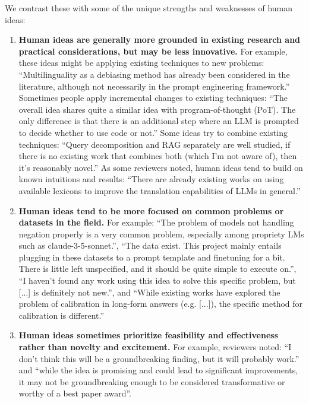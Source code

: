 We contrast these with some of the unique strengths and weaknesses of human ideas:

\begin{enumerate}
    \item \textbf{Human ideas are generally more grounded in existing research and practical considerations, but may be less innovative.} For example, these ideas might be applying existing techniques to new problems: ``Multilinguality as a debiasing method has already been considered in the literature, although not necessarily in the prompt engineering framework.'' Sometimes people apply incremental changes to existing techniques: ``The overall idea shares quite a similar idea with program-of-thought (PoT). The only difference is that there is an additional step where an LLM is prompted to decide whether to use code or not.'' Some ideas try to combine existing techniques: ``Query decomposition and RAG separately are well studied, if there is no existing work that combines both (which I'm not aware of), then it's reasonably novel.'' As some reviewers noted, human ideas tend to build on known intuitions and results: ``There are already existing works on using available lexicons to improve the translation capabilities of LLMs in general.'' 

    \item \textbf{Human ideas tend to be more focused on common problems or datasets in the field.} For example:  ``The problem of models not handling negation properly is a very common problem, especially among propriety LMs such as claude-3-5-sonnet.'', ``The data exist. This project mainly entails plugging in these datasets to a prompt template and finetuning for a bit. There is little left unspecified, and it should be quite simple to execute on.'', ``I haven't found any work using this idea to solve this specific problem, but [...] is definitely not new.'', and ``While existing works have explored the problem of calibration in long-form answers (e.g. [...]), the specific method for calibration is different.''

    \item \textbf{Human ideas sometimes prioritize feasibility and effectiveness rather than novelty and excitement.} For example, reviewers noted: ``I don't think this will be a groundbreaking finding, but it will probably work.'' and ``while the idea is promising and could lead to significant improvements, it may not be groundbreaking enough to be considered transformative or worthy of a best paper award''. 
\end{enumerate}



